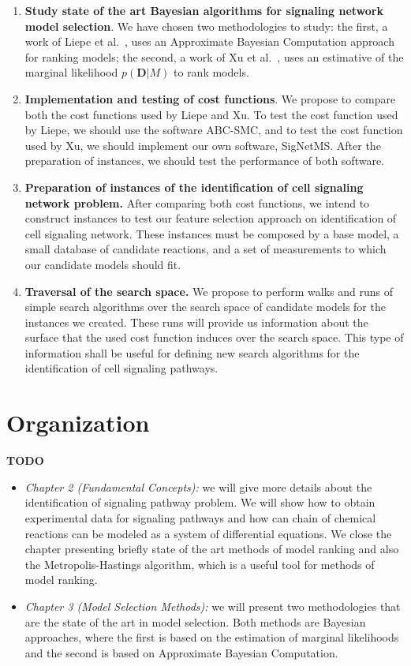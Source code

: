 \begin{enumerate}
    \item{{\bf Study state of the art Bayesian algorithms for signaling
        network model selection}. We have chosen two methodologies to
        study: the first, a work of Liepe et al.~\cite{Liepe2014}, uses
        an Approximate Bayesian Computation approach for ranking models;
        the second, a work of Xu et al.~\cite{Xura20}, uses an
        estimative of the marginal likelihood $p({\bm D}| M)$ to rank
        models.}
    \item{{\bf Implementation and testing of cost functions}. We propose
        to compare both the cost functions used by Liepe and Xu. To test
        the cost function used by Liepe, we should use the software
        ABC-SMC, and to test the cost function used by Xu, we should
        implement our own software, SigNetMS. After the preparation of
        instances, we should test the performance of both software.}
    \item{{\bf Preparation of instances of the identification of cell
        signaling network problem.} After comparing both cost functions,
        we intend to construct instances to test our feature selection
        approach on identification of cell signaling network. These
        instances must be composed by a base model, a small database of
        candidate reactions, and a set of measurements to which our
        candidate models should fit.}
    \item{{\bf Traversal of the search space.} We propose to perform
        walks and runs of simple search algorithms over the search space
        of candidate models for the instances we created. These runs
        will provide us information about the surface that the used cost 
        function induces over the search space. This type of information
        shall be useful for defining new search algorithms for the
        identification of cell signaling pathways.}
\end{enumerate}
\section{Organization}
{\color{blue}\bf TODO}
\begin{itemize}
    \item{\em Chapter 2 (Fundamental Concepts):} we will give more details
        about the identification of signaling pathway problem. We will
        show how to obtain experimental data for signaling pathways and
        how can chain of chemical reactions can be modeled as a system 
        of differential equations. We close the chapter presenting 
        briefly state of the art methods of model ranking and also the 
        Metropolis-Hastings algorithm, which is a useful tool for 
        methods of model ranking.
    \item{\em Chapter 3 (Model Selection Methods):} we will present two
        methodologies that are the state of the art in model selection.
        Both methods are Bayesian approaches, where the first is based
        on the estimation of marginal likelihoods and the second is
        based on Approximate Bayesian Computation.
\end{itemize}
